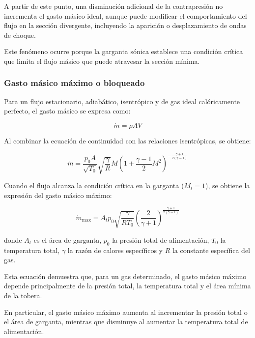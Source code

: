 \documentclass[12pt,letterpaper]{article}
\numberwithin{equation}{section}
\begin{document}
A partir de este punto, una disminución
adicional de la contrapresión no
incrementa el gasto másico ideal,
aunque puede modificar el comportamiento
del flujo en la sección divergente,
incluyendo la aparición o desplazamiento
de ondas de choque.

Este fenómeno ocurre porque la garganta
sónica establece una condición crítica
que limita el flujo másico que puede
atravesar la sección mínima.


\subsubsection{Gasto másico máximo o bloqueado}

Para un flujo estacionario, adiabático,
isentrópico y de gas ideal calóricamente
perfecto, el gasto másico se expresa como:

\begin{equation}
    \dot{m}=\rho AV
\end{equation}

Al combinar la ecuación de continuidad
con las relaciones isentrópicas, se obtiene:

\begin{equation}
    \dot{m}=
    \frac{p_0 A}{\sqrt{T_0}}
    \sqrt{\frac{\gamma}{R}}
    M
    \left(
    1+\frac{\gamma-1}{2}M^2
    \right)^{
    -\frac{\gamma+1}{2(\gamma-1)}
    }
\end{equation}

Cuando el flujo alcanza la condición
crítica en la garganta ($M_t=1$),
se obtiene la expresión del gasto
másico máximo:

\begin{equation}
    \boxed{
    \dot{m}_{\max}=
    A_t p_0
    \sqrt{\frac{\gamma}{RT_0}}
    \left(
    \frac{2}{\gamma+1}
    \right)^{
    \frac{\gamma+1}{2(\gamma-1)}
    }
    }
    \label{eq:gasto_masico_bloqueado}
\end{equation}

donde $A_t$ es el área de garganta,
$p_0$ la presión total de alimentación,
$T_0$ la temperatura total,
$\gamma$ la razón de calores específicos
y $R$ la constante específica del gas.

Esta ecuación demuestra que, para
un gas determinado, el gasto másico
máximo depende principalmente de
la presión total, la temperatura total
y el área mínima de la tobera.

En particular, el gasto másico máximo
aumenta al incrementar la presión total
o el área de garganta, mientras que
disminuye al aumentar la temperatura
total de alimentación.
\end{document}
